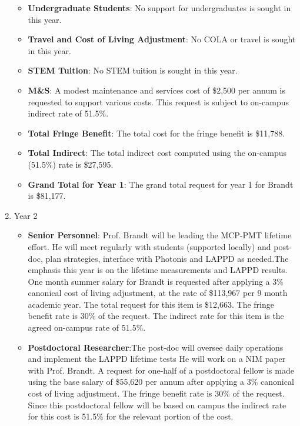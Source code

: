 \begin{enumerate}
\begin{itemize}[noitemsep,nolistsep]
\item {{\bf Undergraduate Students}: No support for undergraduates is sought in this year.}

\item{{\bf Travel and Cost of Living Adjustment}: No COLA or travel is sought in this year.}

\item {{\bf STEM Tuition}: No STEM tuition is sought in this year.}

\item {{\bf M\&S}: A modest maintenance and services cost of \$2,500 per annum is requested to support various costs.   This request is subject to on-campus indirect rate of 51.5\%.}

\item {{\bf Total Fringe Benefit}: The total cost for the fringe benefit is \$11,788.}

\item {{\bf Total Indirect}: The total indirect cost computed using the on-campus (51.5\%) rate is \$27,595.}

\item {{\bf Grand Total for Year 1}: The grand total request for year 1 for Brandt is \$81,177.}

\end{itemize}

\item{Year 2}
\begin{itemize}[noitemsep,nolistsep]
\item{{\bf Senior Personnel}:  Prof. Brandt will be leading the MCP-PMT lifetime effort. He will meet regularly with students (supported locally) and post-doc, plan strategies, interface with Photonis  and LAPPD as needed.The emphasis this year is on the lifetime measurements and LAPPD results. One month summer salary for Brandt is requested after applying a 3\% canonical cost of living adjustment, at the rate of \$113,967 per 9 month academic year.  The total request for this item is \$12,663.   The fringe benefit rate is 30\% of the request.  The indirect rate for this item is the agreed on-campus rate of 51.5\%.}

\item {{\bf Postdoctoral Researcher}:The post-doc will oversee daily operations and implement the LAPPD lifetime tests
He will work on a NIM paper with Prof. Brandt. A request for one-half of a postdoctoral fellow is made using the base salary of \$55,620 per annum after applying a 3\% canonical cost of living adjustment.  The fringe benefit rate is 30\% of the request.  Since this postdoctoral fellow will be based on campus the indirect rate for this cost is 51.5\% for the relevant portion of the cost.} 


\end{itemize}
\end{enumerate}
